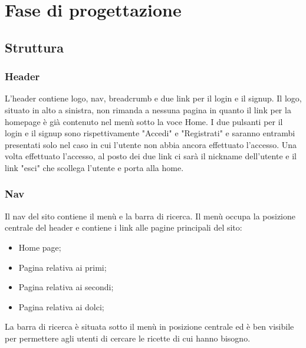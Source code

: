 \section{Fase di progettazione}
\label{sec:fase_di_progettazione}
\subsection{Struttura}
\label{sub:struttura}
\subsubsection{Header}
\label{ssub:header}
L'header contiene logo, nav, breadcrumb e due link per il login e il signup. Il logo, situato in alto a sinistra, non rimanda a nessuna pagina in quanto il link per la homepage è già contenuto nel menù sotto la voce Home. I due pulsanti per il login e il signup sono rispettivamente "Accedi" e "Registrati" e saranno entrambi presentati solo nel caso in cui l'utente non abbia ancora effettuato l'accesso. Una volta effettuato l'accesso, al posto dei due link ci sarà il nickname dell'utente e il link "esci" che scollega l'utente e porta alla home.
\subsubsection{Nav}
\label{ssub:nav}
Il nav del sito contiene il menù e la barra di ricerca.
Il menù occupa la posizione centrale del header e contiene i link alle pagine principali del sito:
\begin{itemize}
	\item Home page;
	\item Pagina relativa ai primi;
	\item Pagina relativa ai secondi;
	\item Pagina relativa ai dolci;
\end{itemize}
La barra di ricerca è situata sotto il menù in posizione centrale ed è ben visibile per permettere agli utenti di cercare le ricette di cui hanno bisogno.
